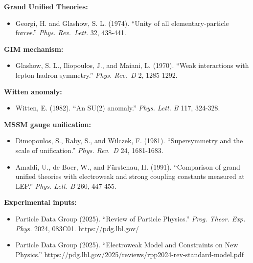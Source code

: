 \documentclass[11pt,a4paper]{article}
\theoremstyle{remark}
\providecommand{\tightlist}{%
  \setlength{\itemsep}{0pt}\setlength{\parskip}{0pt}}
\begin{document}
\textbf{Grand Unified Theories:}

\begin{itemize}
\tightlist
\item
  Georgi, H. and Glashow, S. L. (1974). ``Unity of all elementary-particle
  forces.'' \emph{Phys. Rev.~Lett.} 32, 438-441.
\end{itemize}

\textbf{GIM mechanism:}

\begin{itemize}
\tightlist
\item
  Glashow, S. L., Iliopoulos, J., and Maiani, L. (1970). ``Weak interactions
  with lepton-hadron symmetry.'' \emph{Phys. Rev.~D} 2, 1285-1292.
\end{itemize}

\textbf{Witten anomaly:}

\begin{itemize}
\tightlist
\item
  Witten, E. (1982). ``An SU(2) anomaly.'' \emph{Phys. Lett. B} 117, 324-328.
\end{itemize}

\textbf{MSSM gauge unification:}

\begin{itemize}
\tightlist
\item
  Dimopoulos, S., Raby, S., and Wilczek, F. (1981). ``Supersymmetry and the
  scale of unification.'' \emph{Phys. Rev.~D} 24, 1681-1683.
\item
  Amaldi, U., de Boer, W., and F\"urstenau, H. (1991). ``Comparison of grand
  unified theories with electroweak and strong coupling constants measured
  at LEP.'' \emph{Phys. Lett. B} 260, 447-455.
\end{itemize}

\textbf{Experimental inputs:}

\begin{itemize}
\tightlist
\item
  Particle Data Group (2025). ``Review of Particle Physics.'' \emph{Prog. Theor.
  Exp. Phys.} 2024, 083C01. https://pdg.lbl.gov/
\item
  Particle Data Group (2025). ``Electroweak Model and Constraints on New
  Physics.'' https://pdg.lbl.gov/2025/reviews/rpp2024-rev-standard-model.pdf
\end{itemize}
\end{document}
